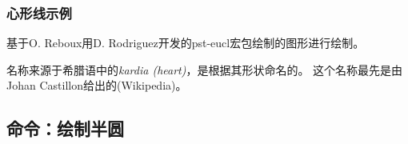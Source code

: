 \documentclass[../main.tex]{subfiles}
\begin{document}
\subsubsection{心形线示例}

基于O. Reboux用D. Rodriguez开发的pst-eucl宏包绘制的图形进行绘制。

名称来源于希腊语中的\textit{kardia (heart)}，是根据其形状命名的。
这个名称最先是由Johan Castillon给出的(Wikipedia)。

\begin{tkzexample}[latex=7cm,small]
\end{tkzexample}

\newpage

\subsection{命令：绘制半圆}
\end{document}
